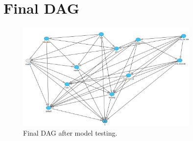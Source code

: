 \documentclass[11pt]{article}
\begin{document}
\section{Final DAG}
\label{sec:finall_dag}
\begin{figure}[h]
	\centering
	\includegraphics[width=0.8\textwidth]{images/final_dag}
	\caption{Final DAG after model testing.}
	\label{fig:final_dag}
\end{figure}

\newpage
\end{document}
